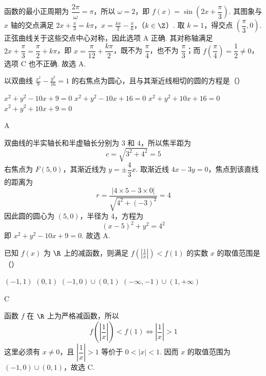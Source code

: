 \begin{solution}
函数的最小正周期为 \(\dfrac{2\pi}{\omega}=\pi\)，所以 \(\omega=2\)，即 \(f(x)=\sin\left(2x+\dfrac{\pi}{3}\right)\). 其图象与 \(x\) 轴的交点满足
\(2x+\frac{\pi}{3}=k\pi\)，\(x=\frac{k\pi}{2}-\frac{\pi}{6}\)，（\(k\in\Z\)）.
取 \(k=1\)，得交点 \(\left(\dfrac{\pi}{3},0\right)\). 正弦曲线关于这些交点中心对称，因此选项 A 正确. 其对称轴满足 \(2x+\dfrac{\pi}{3}=\dfrac{\pi}{2}+k\pi\)，即 \(x=\dfrac{\pi}{12}+\dfrac{k\pi}{2}\)，既不为 \(\dfrac{\pi}{4}\)，也不为 \(\dfrac{\pi}{3}\)；而 \(f\left(\dfrac{\pi}{4}\right)=\dfrac12\neq0\)，选项 C 也不正确. 故选 A.
\end{solution}

\begin{problem}
以双曲线 \(\frac{x^2}{9} - \frac{y^2}{16} = 1\) 的右焦点为圆心，且与其渐近线相切的圆的方程是（\quad）

\choices
    {\(x^{2} + y^{2} - 10x + 9 = 0\)}
    {\(x^{2} + y^{2} - 10x + 16 = 0\)}
    {\(x^{2} + y^{2} + 10x + 16 = 0\)}
    {\(x^{2} + y^{2} + 10x + 9 = 0\)}
\end{problem}

\begin{answer}
A
\end{answer}

\begin{solution}
双曲线的半实轴长和半虚轴长分别为 \(3\) 和 \(4\)，所以焦半距为
\[
c=\sqrt{3^2+4^2}=5
\]
右焦点为 \(F(5,0)\)，其渐近线为 \(y=\pm\dfrac{4}{3}x\). 取渐近线 \(4x-3y=0\)，焦点到该直线的距离为
\[
r=\frac{|4\times5-3\times0|}{\sqrt{4^2+(-3)^2}}=4
\]
因此圆的圆心为 \((5,0)\)，半径为 \(4\)，方程为
\[
(x-5)^2+y^2=4^2
\]
即 \(x^2+y^2-10x+9=0\). 故选 A.
\end{solution}

\begin{problem}
已知 \( f(x) \) 为 \( \R \) 上的减函数，则满足 \( f\left(\left|\frac{1}{x}\right|\right) < f(1) \) 的实数 \( x \) 的取值范围是（\quad）

\choices
    {\((-1, 1)\)}
    {\((0,1)\)}
    {\((-1,0)\cup (0,1)\)}
    {\((-\infty, -1) \cup (1, +\infty)\)}
\end{problem}

\begin{answer}
C
\end{answer}

\begin{solution}
函数 \(f\) 在 \(\R\) 上为严格减函数，所以
\[
f\left(\left|\frac{1}{x}\right|\right)<f(1)
\Longleftrightarrow \left|\frac{1}{x}\right|>1
\]
这里必须有 \(x\neq0\)，且 \(\left|\dfrac{1}{x}\right|>1\) 等价于 \(0<|x|<1\). 因而 \(x\) 的取值范围为 \((-1,0)\cup(0,1)\)，故选 C.
\end{solution}

